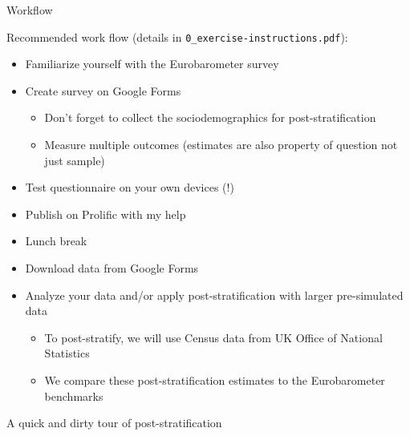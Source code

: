 \documentclass[aspectratio=169]{beamer}
\begin{document}
\begin{frame}{Workflow}

Recommended work flow (details in \nolinkurl{0_exercise-instructions.pdf}):

\begin{itemize}
\item Familiarize yourself with the Eurobarometer survey
\pause
\item Create survey on Google Forms 
\begin{itemize}
    \item Don't forget to collect the sociodemographics for post-stratification
    \item Measure multiple outcomes (estimates are also property of question not just sample)
\end{itemize}
\pause
\item Test questionnaire on your own devices (!)
\pause
\item Publish on Prolific with my help
\pause
\item Lunch break
\pause
\item Download data from Google Forms
\pause
\item Analyze your data and/or apply post-stratification with larger pre-simulated data 
\begin{itemize}
    \item To post-stratify, we will use Census data from UK Office of National Statistics
    \item We compare these post-stratification estimates to the Eurobarometer benchmarks
\end{itemize}
\end{itemize}

\end{frame}
\begin{frame}

\begin{center}
\LARGE{A quick and dirty tour of post-stratification}
\end{center}

\end{frame}
\end{document}

